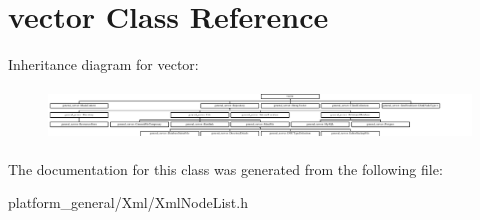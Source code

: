 \hypertarget{classvector}{\section{vector \-Class \-Reference}
\label{classvector}
}
\-Inheritance diagram for vector\-:\begin{figure}[H]
\begin{center}
\leavevmode
\includegraphics[height=1.384083cm]{classvector}
\end{center}
\end{figure}


\-The documentation for this class was generated from the following file\-:\begin{DoxyCompactItemize}
\item 
platform\-\_\-general/\-Xml/\-Xml\-Node\-List.\-h\end{DoxyCompactItemize}
